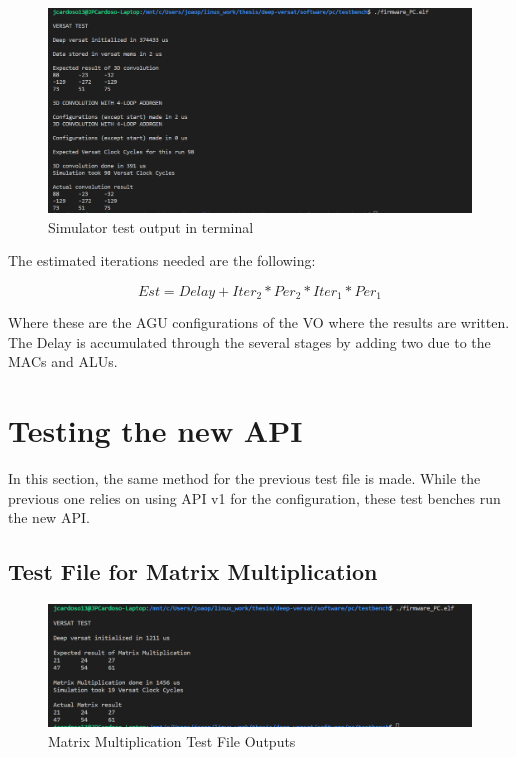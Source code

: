 


\begin{figure}[!htbp]
    \centering
    \includegraphics[width=\textwidth]{Figures/test1.png}
    \caption{Simulator test output in terminal}
    \label{figure:test1}
\end{figure} 

The estimated iterations needed are the following:

\[ Est=Delay+Iter_2*Per_2*Iter_1*Per_1\]

Where these are the AGU configurations of the VO where the results are written. The Delay is accumulated
through the several stages by adding two due to the MACs and ALUs.




\section{Testing the new API}
\label{section:testgencov}

In this section, the same method for the previous test file is made. 
While the previous one relies on using API v1 for the configuration, these test benches
run the new API. 

\subsection{Test File for Matrix Multiplication}

\begin{figure}[!htbp]
    \centering
    \includegraphics[width=\textwidth]{Figures/test2.png}
    \caption{Matrix Multiplication Test File Outputs}
    \label{figure:test2}
\end{figure}

